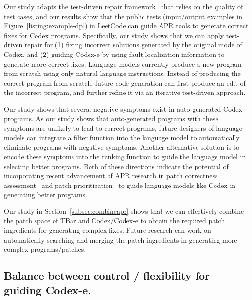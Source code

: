 \begin{description}[leftmargin=*]
    \item[\emph{Test-driven repair framework.}] 

   Our study adapts the test-driven repair framework~\cite{qi2015analysis,genprog12} that relies on the quality of test cases, and our results show that the public tests (input/output examples in Figure~\ref{listing:example-dp}) in LeetCode can guide APR tools to generate correct fixes for Codex programs. Specifically, our study shows that we can apply test-driven repair for (1) fixing incorrect solutions generated by the original mode of Codex, and (2) guiding Codex-e by using fault localization information to generate more correct fixes. Language models currently produce a new program from scratch using only natural language instructions. Instead of producing the correct program from scratch, future code generation can first produce an edit of the incorrect program, and further refine it via an iterative test-driven approach.

    \item[\emph{Prioritization of correct programs.}] Our study shows that several negative symptoms exist in auto-generated Codex programs. As our study shows that auto-generated programs with these symptoms are unlikely to lead to correct programs, future designers of language models can integrate a filter function into the language model to automatically eliminate programs with negative symptoms. Another alternative solution is to encode these symptoms into the ranking function to guide the language model in selecting better programs. Both of these directions indicate the potential of incorporating recent advancement of APR research in patch correctness assessment~\cite{anti-pattern,wang2020automated} and patch prioritization~\cite{ye2021automated,ghanbari2020objsim} to guide language models like Codex in generating better programs.
     \item[\emph{Obtaining patch ingredients.}] Our study in Section~\ref{subsec:combineapr} shows that we can effectively combine the patch space of TBar and Codex/Codex-e to obtain the required patch ingredients for generating complex fixes. Future research can work on automatically searching and merging the patch ingredients in generating more complex programs/patches.
\end{description}

\subsection{Balance between control / flexibility for guiding Codex-e.}

